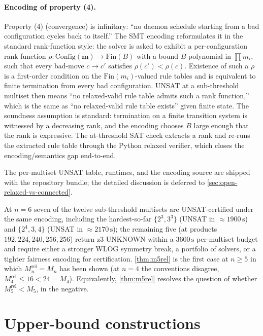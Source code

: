 \documentclass[11pt,a4paper]{article}
\theoremstyle{plain}
\theoremstyle{definition}
\newcommand{\Config}{\mathrm{Config}}
\begin{document}
\paragraph{Encoding of property (4).}  Property (4)
(convergence) is infinitary: ``no daemon schedule starting from
a bad configuration cycles back to itself.''  The SMT encoding
reformulates it in the standard rank-function style: the solver is
asked to exhibit a per-configuration rank function $\rho :
\Config(\mathbf{m}) \to \mathrm{Fin}(B)$ with a bound $B$
polynomial in $\prod m_i$, such that every bad-move $c \to c'$
satisfies $\rho(c') < \rho(c)$.  Existence of such a $\rho$ is a
first-order condition on the $\mathrm{Fin}(m_i)$-valued rule
tables and is equivalent to finite termination from every bad
configuration.  UNSAT at a sub-threshold multiset then means
``no relaxed-valid rule table admits such a rank function,''
which is the same as ``no relaxed-valid rule table exists'' given
finite state.  The soundness assumption is standard: termination
on a finite transition system is witnessed by a decreasing rank,
and the encoding chooses $B$ large enough that the rank is
expressive.  The at-threshold SAT check extracts a rank and
re-runs the extracted rule table through the Python relaxed
verifier, which closes the encoding/semantics gap end-to-end.

The
per-multiset UNSAT table, runtimes, and the encoding source are
shipped with the repository bundle; the detailed discussion is
deferred to \cref{sec:open-relaxed-vs-connected}.

At $n = 6$ seven of the twelve sub-threshold multisets are
UNSAT-certified under the same encoding, including the hardest-so-far
$\{2^3, 3^3\}$ (UNSAT in $\approx 1900\,\mathrm{s}$) and
$\{2^4, 3, 4\}$ (UNSAT in $\approx 2170\,\mathrm{s}$); the remaining
five (at products $192, 224, 240, 256, 256$) return z3 UNKNOWN
within a $3600\,\mathrm{s}$ per-multiset budget and require either a
stronger WLOG symmetry break, a portfolio of solvers, or a tighter
fairness encoding for certification.  \cref{thm:m5rel} is the first case at
$n \ge 5$ in which $M_n^{\mathrm{rel}} = M_n$ has been shown (at
$n = 4$ the conventions disagree, $M_4^{\mathrm{rel}} \le 16 <
24 = M_4$).  Equivalently, \cref{thm:m5rel} resolves the question
of whether $M_5^{\mathrm{rel}} < M_5$, in the negative.

\section{Upper-bound constructions}\label{sec:upper}
\end{document}

